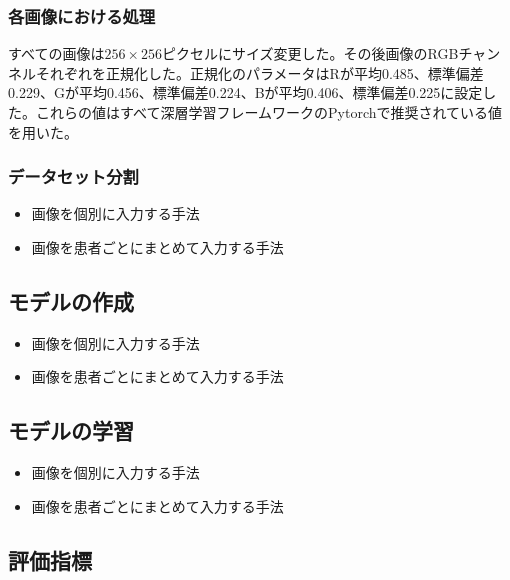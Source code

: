 \subsubsection{各画像における処理}
すべての画像は$256 \times 256$ピクセルにサイズ変更した。その後画像のRGBチャンネルそれぞれを正規化した。正規化のパラメータはRが平均0.485、標準偏差0.229、Gが平均0.456、標準偏差0.224、Bが平均0.406、標準偏差0.225に設定した。これらの値はすべて深層学習フレームワークのPytorchで推奨されている値を用いた。
\subsubsection{データセット分割}
\begin{itemize}
    \item 画像を個別に入力する手法
    \item 画像を患者ごとにまとめて入力する手法
\end{itemize}
\subsection{モデルの作成}
\begin{itemize}
    \item 画像を個別に入力する手法
    \item 画像を患者ごとにまとめて入力する手法
\end{itemize}
\subsection{モデルの学習}
\begin{itemize}
    \item 画像を個別に入力する手法
    \item 画像を患者ごとにまとめて入力する手法
\end{itemize}
\subsection{評価指標}
